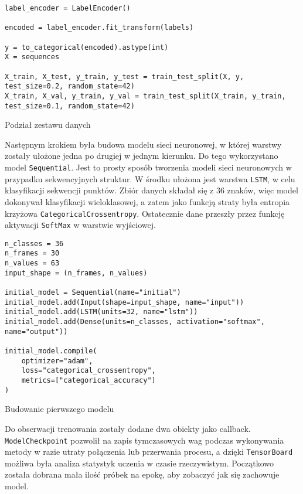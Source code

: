 \begin{listing}[H]
    \color{white}
    \begin{verbatim}
label_encoder = LabelEncoder()

encoded = label_encoder.fit_transform(labels)

y = to_categorical(encoded).astype(int)
X = sequences

X_train, X_test, y_train, y_test = train_test_split(X, y, test_size=0.2, random_state=42)
X_train, X_val, y_train, y_val = train_test_split(X_train, y_train, test_size=0.1, random_state=42)
    \end{verbatim}
    \caption{Podział zestawu danych}
    \label{lst:dataset-splitting}
\end{listing}

Następnym krokiem była budowa modelu sieci neuronowej, w której warstwy zostały ułożone jedna po drugiej w jednym kierunku. Do tego wykorzystano model \texttt{Sequential}. Jest to prosty sposób tworzenia modeli sieci neuronowych w przypadku sekwencyjnych struktur. W środku ułożona jest warstwa \texttt{LSTM}, w celu klasyfikacji sekwencji punktów. Zbiór danych składał się z 36 znaków, więc model dokonywał klasyfikacji wieloklasowej, a zatem jako funkcją straty była entropia krzyżowa \texttt{CategoricalCrossentropy}. Ostatecznie dane przeszły przez funkcję aktywacji \texttt{SoftMax} w warstwie wyjściowej.

\begin{listing}[H]
    \color{white}
    \begin{verbatim}
n_classes = 36
n_frames = 30
n_values = 63
input_shape = (n_frames, n_values)

initial_model = Sequential(name="initial")
initial_model.add(Input(shape=input_shape, name="input"))
initial_model.add(LSTM(units=32, name="lstm"))
initial_model.add(Dense(units=n_classes, activation="softmax", name="output"))

initial_model.compile(
    optimizer="adam",
    loss="categorical_crossentropy",
    metrics=["categorical_accuracy"]
)
    \end{verbatim}
    \caption{Budowanie pierwszego modelu}
    \label{lst:initial-model-building}
\end{listing}

Do obserwacji trenowania zostały dodane dwa obiekty jako callback. \texttt{ModelCheckpoint} pozwolił na zapis tymczasowych wag podczas wykonywania metody w razie utraty połączenia lub przerwania procesu, a dzięki \texttt{TensorBoard} możliwa była analiza statystyk uczenia w czasie rzeczywistym. Początkowo została dobrana mała ilość próbek na epokę, aby zobaczyć jak się zachowuje model.

